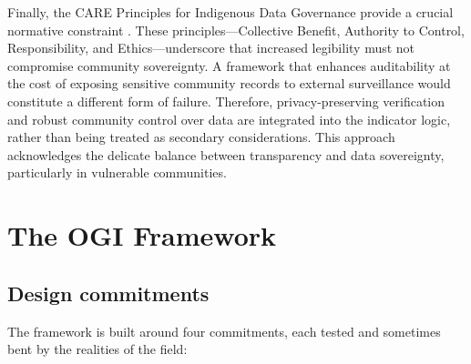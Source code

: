 \documentclass[sigconf,anonymous]{acmart}
\begin{document}
Finally, the CARE Principles for Indigenous Data Governance provide a crucial normative constraint \cite{carroll2020}. These principles—Collective Benefit, Authority to Control, Responsibility, and Ethics—underscore that increased legibility must not compromise community sovereignty. A framework that enhances auditability at the cost of exposing sensitive community records to external surveillance would constitute a different form of failure. Therefore, privacy-preserving verification and robust community control over data are integrated into the indicator logic, rather than being treated as secondary considerations. This approach acknowledges the delicate balance between transparency and data sovereignty, particularly in vulnerable communities.

\section{The OGI Framework}

\subsection{Design commitments}

The framework is built around four commitments, each tested and sometimes bent by the realities of the field:
\end{document}
